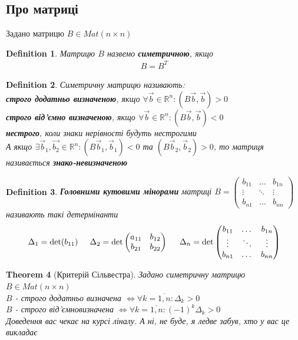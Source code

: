 \documentclass[a4paper, 14pt]{extarticle}
\def\bigline{\vspace{5mm}\\}
\theoremstyle{theoremdd}
\newtheorem{theorem}{Theorem}[subsection]
\theoremstyle{theoremdd}
\newtheorem{definition}[theorem]{Definition}
\theoremstyle{theoremdd}
\theoremstyle{theoremdd}
\theoremstyle{theoremdd}
\theoremstyle{theoremdd}
\theoremstyle{theoremdd}
\theoremstyle{theoremdd}
\begin{document}
\subsection*{Про матриці}
Задано матрицю $B \in Mat(n \times n)$
\begin{definition}
Матрицю $B$ назвемо \textbf{симетричною}, якщо
\begin{align*}
B = B^T
\end{align*}
\end{definition}

\begin{definition}
Симетричну матрицю називають:\\
\textbf{строго додатньо визначеною}, якщо $\forall \vec{b} \in \mathbb{R}^n: (B \vec{b}, \vec{b}) > 0$\\
\textbf{строго від'ємно визначеною}, якщо $\forall \vec{b} \in \mathbb{R}^n: (B \vec{b}, \vec{b}) < 0$\\
\textbf{нестрого}, коли знаки нерівності будуть нестрогими
\bigline
А якщо $\exists \vec{b}_1, \vec{b_2} \in \mathbb{R}^n: (B\vec{b}_1, \vec{b}_1) < 0$ та $(B\vec{b}_2, \vec{b}_2) > 0$, то матриця називається \textbf{знако-невизначеною}
\end{definition}

\begin{definition}
\textbf{Головними кутовими мінорами} матриці $B = \begin{pmatrix}
b_{11} & \dots & b_{1n} \\
\vdots & \ddots & \vdots \\
b_{n1} & \dots & b_{nn}
\end{pmatrix}$ називають такі детермінанти 
\begin{align*}
\Delta_1 = \det (b_{11}) \hspace{0.5cm} \Delta_2 = \det \begin{pmatrix}
a_{11} & b_{12} \\
b_{21} & b_{22}
\end{pmatrix} \hspace{0.5cm} \Delta_n = \det \begin{pmatrix}
b_{11} & \dots & b_{1n} \\
\vdots & \ddots & \vdots \\
b_{n1} & \dots & b_{nn}
\end{pmatrix}
\end{align*}
\end{definition}

\begin{theorem}[Критерій Сільвестра]
Задано симетричну матрицю $B \in Mat(n \times n)$\\
$B$ - строго додатньо визначена $\iff \forall k = \overline{1,n}: \Delta_k > 0$\\
$B$ - строго від'ємновизначена $\iff \forall k = \overline{1,n}: (-1)^k\Delta_k > 0$\\
\textit{Доведення вас чекає на курсі ліналу. А ні, не буде, я ледве забув, хто у вас це викладає}
\end{theorem}
\end{document}
